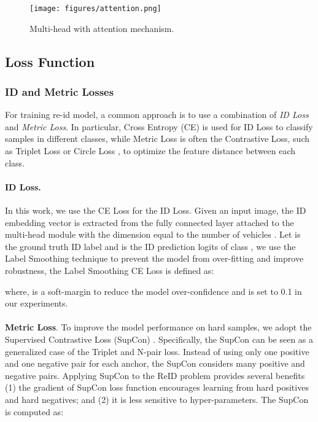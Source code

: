 \documentclass[10pt,twocolumn,letterpaper]{article}
\begin{document}
\begin{figure}
	\texttt{[image: figures/attention.png]}
	\caption{Multi-head with attention mechanism.}
	\label{fig:attention}
\end{figure}

\subsection{Loss Function} \label{sub:loss_function}
\subsubsection{ID and Metric Losses } \label{sub:id_metric_loss}
For training re-id model, a common approach is to use a combination of \textit{ID Loss} and \textit{Metric Loss}. In particular, Cross Entropy (CE) is used for ID Loss to classify samples in different classes, while Metric Loss is often the Contrastive Loss, such as Triplet Loss \cite{triplet} or Circle Loss \cite{circle_loss}, to optimize the feature distance between each class.

\paragraph{ID Loss.} In this work, we use the CE Loss for the ID Loss. Given an input image, the ID embedding vector is extracted from the fully connected layer attached to the multi-head module with the dimension equal to the number of vehicles . Let  is the ground truth ID label and  is the ID prediction logits of class , we use the Label Smoothing technique \cite{lsce} to prevent the model from over-fitting and improve robustness, the Label Smoothing CE Loss is defined as:



where,  is a soft-margin to reduce the model over-confidence and is set to 0.1 in our experiments.	\\\\
\textbf{Metric Loss}. To improve the model performance on hard samples, we adopt the Supervised Contrastive Loss (SupCon) \cite{supcon}. Specifically, the SupCon can be seen as a generalized case of the Triplet and N-pair loss. Instead of using only one positive and one negative pair for each anchor, the SupCon considers many positive and negative pairs. Applying SupCon to the ReID problem provides several benefits (1) the gradient of SupCon loss function encourages learning from hard positives and hard negatives; and (2) it is less sensitive to hyper-parameters. The SupCon is computed as:
\end{document}
